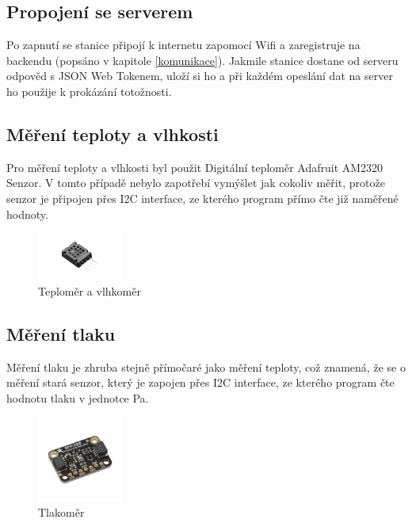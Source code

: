 \subsection{Propojení se serverem}
Po zapnutí se stanice připojí k internetu zapomocí Wifi a zaregistruje na backendu (popsáno v kapitole \ref{komunikace}). Jakmile stanice dostane od serveru odpověd s 
JSON Web Tokenem, uloží si ho a při každém opeslání dat na server ho použije k prokázání totožnosti.

\subsection{Měření teploty a vlhkosti}
Pro měření teploty a vlhkosti byl použit Digitální teploměr Adafruit AM2320 Senzor\cite{teplomer}. V tomto případě nebylo zapotřebí vymýšlet jak cokoliv měřit,
protože senzor je připojen přes I2C interface, ze kterého program přímo čte již naměřené hodnoty.
\begin{figure}[h] 
    \centering
    \includegraphics[width=0.25\textwidth]{images/Adafruit-AM2320.jpg}
    \caption{Teploměr a vlhkoměr}
\end{figure}

\subsection{Měření tlaku}
Měření tlaku je zhruba stejně přímočaré jako měření teploty, což znamená, že se o měření stará senzor\cite{tlakoměr},
který je zapojen přes I2C interface, ze kterého program čte hodnotu tlaku v jednotce Pa.

\begin{figure}[h] 
    \centering
    \includegraphics[width=0.25\textwidth]{images/Adafruit-BMP280.jpg}
    \caption{Tlakoměr}
\end{figure}
